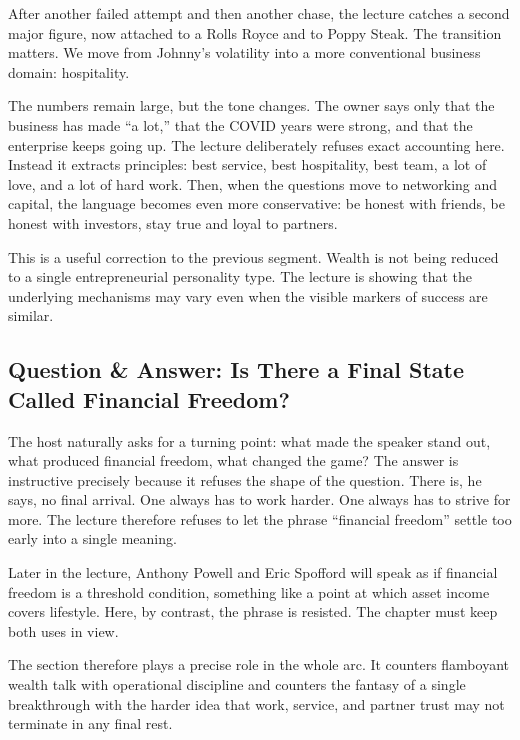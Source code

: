 After another failed attempt and then another chase, the lecture catches a second major figure, now attached to a Rolls Royce and to Poppy Steak. The transition matters. We move from Johnny's volatility into a more conventional business domain: hospitality.

The numbers remain large, but the tone changes. The owner says only that the business has made ``a lot,'' that the COVID years were strong, and that the enterprise keeps going up. The lecture deliberately refuses exact accounting here. Instead it extracts principles: best service, best hospitality, best team, a lot of love, and a lot of hard work. Then, when the questions move to networking and capital, the language becomes even more conservative: be honest with friends, be honest with investors, stay true and loyal to partners.

This is a useful correction to the previous segment. Wealth is not being reduced to a single entrepreneurial personality type. The lecture is showing that the underlying mechanisms may vary even when the visible markers of success are similar.

\subsection{Question \& Answer: Is There a Final State Called Financial Freedom?}

The host naturally asks for a turning point: what made the speaker stand out, what produced financial freedom, what changed the game? The answer is instructive precisely because it refuses the shape of the question. There is, he says, no final arrival. One always has to work harder. One always has to strive for more. The lecture therefore refuses to let the phrase ``financial freedom'' settle too early into a single meaning.

\begin{remark}
Later in the lecture, Anthony Powell and Eric Spofford will speak as if financial freedom is a threshold condition, something like a point at which asset income covers lifestyle. Here, by contrast, the phrase is resisted. The chapter must keep both uses in view.
\end{remark}

The section therefore plays a precise role in the whole arc. It counters flamboyant wealth talk with operational discipline and counters the fantasy of a single breakthrough with the harder idea that work, service, and partner trust may not terminate in any final rest.

